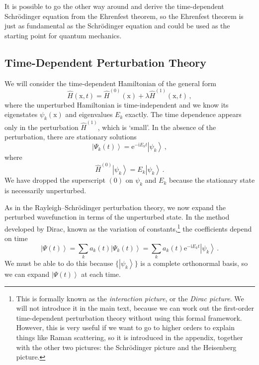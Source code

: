 \documentclass{article}
\theoremstyle{plain}\theoremheaderfont{\normalfont\itshape}\theorembodyfont{\rmfamily}\theoremseparator{.}\newtheorem*{rem}{Remark}\newtheorem*{ex}{Example}\newtheorem*{proof}{Proof}\newtheorem*{altp}{Alternative proof}
\theoremstyle{plain}\theoremheaderfont{\normalfont\bfseries}\theorembodyfont{\rmfamily}\theoremseparator{.}\newtheorem{thm}{Theorem}[section]\newtheorem{lem}[thm]{Lemma}\newtheorem{prop}[thm]{Proposition}\newtheorem*{cor}{Corollary}\newtheorem{defn}[thm]{Definition}\newtheorem{clm}[thm]{Claim}\newtheorem{clminproof}{Claim}
\theoremstyle{break}\theoremheaderfont{\normalfont\itshape}\theorembodyfont{\rmfamily}\theoremseparator{.\medskip}\newtheorem*{proofskip}{Proof}\newtheorem*{exs}{Examples}\newtheorem*{rems}{Remarks}
\theoremstyle{break}\theoremheaderfont{\normalfont\bfseries}\theorembodyfont{\rmfamily}\theoremseparator{.\medskip}\newtheorem{lemskip}[thm]{Lemma}\newtheorem{defnskip}[thm]{Definition}\newtheorem{propskip}[thm]{Proposition}\newtheorem{thmskip}[thm]{Theorem}
\numberwithin{equation}{section}
\newcommand{\ii}{\mathrm{i}}
\newcommand{\ee}{\mathrm{e}}
\newcommand{\ket}[1]{\left| #1 \right\rangle}
\newcommand{\vb}[1]{\bm{\mathrm{#1}}}
\begin{document}
    It is possible to go the other way around and derive the time-dependent Schr\"{o}dinger equation from the Ehrenfest theorem, so the Ehrenfest theorem is just as fundamental as the Schr\"{o}dinger equation and could be used as the starting point for quantum mechanics.

    \subsection{Time-Dependent Perturbation Theory}
    We will consider the time-dependent Hamiltonian of the general form
    \begin{equation}
        \hat{H}(\vb{x},t)=\hat{H}^{(0)}(\vb{x})+\lambda\hat{H}^{(1)}(\vb{x},t)\,,
    \end{equation}
    where the unperturbed Hamiltonian is time-independent and we know its eigenstates \(\psi_k(\vb{x})\) and eigenvalues \(E_k\) exactly. The time dependence appears only in the perturbation \(\hat{H}^{(1)}\), which is `small'. In the absence of the perturbation, there are stationary solutions
    \begin{equation}
        \ket{\Psi_k(t)}=\ee^{-\ii E_k t}\ket{\psi_k}\,,
    \end{equation}
    where
    \begin{equation}
        \hat{H}^{(0)}\ket{\psi_k}=E_k\ket{\psi_k}\,.
    \end{equation}
    We have dropped the superscript \((0)\) on \(\psi_k\) and \(E_k\) because the stationary state is necessarily unperturbed.

    As in the Rayleigh--Schr\"{o}dinger perturbation theory, we now expand the perturbed wavefunction in terms of the unperturbed state. In the method developed by Dirac, known as the variation of constants,\footnote{This is formally known as the \textit{interaction picture}, or the \textit{Dirac picture}. We will not introduce it in the main text, because we can work out the first-order time-dependent perturbation theory without using this formal framework. However, this is very useful if we want to go to higher orders to explain things like Raman scattering, so it is introduced in the appendix, together with the other two pictures: the Schr\"{o}dinger picture and the Heisenberg picture.} the coefficients depend on time
    \begin{equation}
        \ket{\Psi(t)}=\sum_k a_k(t)\ket{\Psi_k(t)}=\sum_k a_k(t) \ee^{-\ii E_k t} \ket{\psi_k}\,.
    \end{equation}
    We must be able to do this because \(\{\ket{\psi_k}\}\) is a complete orthonormal basis, so we can expand \(\ket{\Psi(t)}\) at each time.
\end{document}
